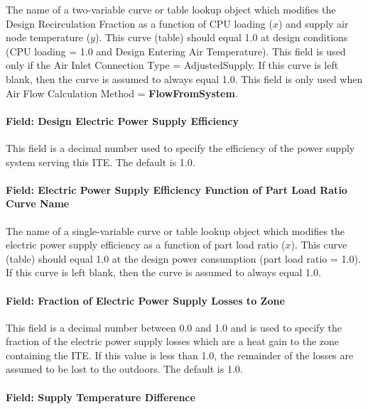 The name of a two-variable curve or table lookup object which modifies the Design Recirculation Fraction as a function of CPU loading ($x$) and supply air node temperature ($y$). This curve (table) should equal 1.0 at design conditions (CPU loading = 1.0 and Design Entering Air Temperature). This field is used only if the Air Inlet Connection Type = AdjustedSupply. If this curve is left blank, then the curve is assumed to always equal 1.0. This field is only used when Air Flow Calculation Method = \textbf{FlowFromSystem}.

\paragraph{Field: Design Electric Power Supply Efficiency}\label{field-design-electric-power-supply-efficiency-ite-definition}

This field is a decimal number used to specify the efficiency of the power supply system serving this ITE. The default is 1.0.

\paragraph{Field: Electric Power Supply Efficiency Function of Part Load Ratio Curve Name}\label{field-electric-power-supply-efficiency-function-of-part-load-ratio-curve-name-ite-definition}

The name of a single-variable curve or table lookup object which modifies the electric power supply efficiency as a function of part load ratio ($x$). This curve (table) should equal 1.0 at the design power consumption (part load ratio = 1.0). If this curve is left blank, then the curve is assumed to always equal 1.0.

\paragraph{Field: Fraction of Electric Power Supply Losses to Zone}\label{field-fraction-of-electric-power-supply-losses-to-zone-ite-definition}

This field is a decimal number between 0.0 and 1.0 and is used to specify the fraction of the electric power supply losses which are a heat gain to the zone containing the ITE. If this value is less than 1.0, the remainder of the losses are assumed to be lost to the outdoors. The default is 1.0.

\paragraph{Field: Supply Temperature Difference}\label{field-supply-temperature-difference-ite-definition}

